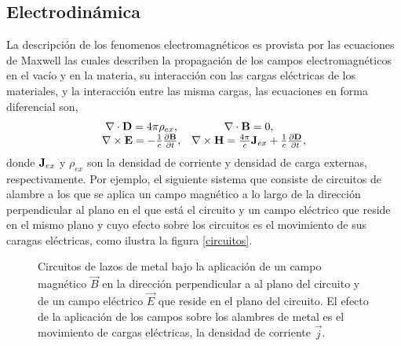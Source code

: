 \documentclass[12pt]{article}
\begin{document}

\subsection{Electrodinámica}
La descripción de los fenomenos electromagnéticos es provista por las
ecuaciones de Maxwell las cuales describen la propagación de los
campos electromagnéticos en el vacío y en la materia, su interacción
con las cargas eléctricas de los materiales, y la interacción entre las
misma cargas, las ecuaciones en forma diferencial son,
\begin{equation}
  \label{Maxwell-eqs}
  \begin{array}{cc}
    \nabla \cdot {\bf D} = 4\pi \rho_{ex}, & \nabla \cdot {\bf B} =0, \\
    \nabla \times {\bf E} = -\frac{1}{c}\frac{\partial {\bf B}}{\partial t}, &
    \nabla \times {\bf H} = \frac{4\pi}{c}{\bf
      J}_{ex} + \frac{1}{c}\frac{\partial {\bf D}}{\partial t},
  \end{array}
\end{equation}
donde ${\bf J}_{ex}$ y $\rho_{ex}$ son la densidad de corriente y
densidad de carga externas, respectivamente. Por ejemplo, el siguiente
sistema que consiste de circuitos de alambre a los que se aplica un
campo magnético a lo largo de la dirección perpendicular al plano en
el que está el circuito y un campo eléctrico que reside en el mismo
plano y cuyo efecto sobre los circuitos es el movimiento de sus
caragas eléctricas, como ilustra la figura \ref{circuitos}.
\begin{figure}
  \centering
  

  \caption{Circuitos de lazos de metal bajo la aplicación de un campo
    magnético $\vec{B}$ en la dirección perpendicular a al plano del
    circuito y de un campo eléctrico $\vec{E}$ que reside en el plano
    del circuito. El efecto de la aplicación de los campos sobre los
    alambres de metal es el movimiento de cargas eléctricas, la
    densidad de corriente $\vec{j}$. }
\label{Circuitos}

\end{figure}
\end{document}
